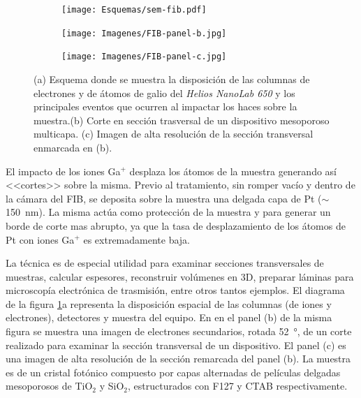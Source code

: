 		\begin{figure}[b!]
			  		  \begin{subfigure}[t]{\textwidth}
			  		  \centering\texttt{[image: Esquemas/sem-fib.pdf]}
			  		  \end{subfigure}
			  		  \begin{subfigure}[t]{0.498\textwidth}
			  		  \texttt{[image: Imagenes/FIB-panel-b.jpg]}
			  		  \end{subfigure}
			  		  \begin{subfigure}[t]{0.498\textwidth}
			  		  \texttt{[image: Imagenes/FIB-panel-c.jpg]}
			  		  \end{subfigure}
			  		  \caption[Esquema de las microscopias FIB/SEM]{(a) Esquema donde se muestra la disposición de las columnas de electrones y de átomos de galio del \textit{Helios NanoLab 650} y los principales eventos que ocurren al impactar los haces sobre la muestra.(b) Corte en sección trasversal de un dispositivo mesoporoso multicapa. (c) Imagen de alta resolución de la sección transversal enmarcada en (b).}
			  		  \label{esq:sem-fib}
			  		  \end{figure}

		El impacto de los iones Ga${^+}$ desplaza los átomos de la muestra generando así <<cortes>> sobre la misma. Previo al tratamiento, sin romper vacío y dentro de la cámara del FIB, se deposita sobre la muestra una delgada capa de Pt ($\sim$\SI{150}{\nm}). La misma actúa como protección de la muestra y para generar un borde de corte mas abrupto, ya que la tasa de desplazamiento de los átomos de Pt con iones Ga${^+}$ es extremadamente baja.\cite{Giannuzzi2005,Orloff1996} 

		\pagebreak La técnica es de especial utilidad para examinar secciones transversales de muestras, calcular espesores, reconstruir volúmenes en 3D, preparar láminas para microscopía electrónica de trasmisión, entre otros tantos ejemplos. El diagrama de la figura \ref{esq:sem-fib}a representa la disposición espacial de las columnas (de iones y electrones), detectores y muestra del equipo. En en el panel (b) de la misma figura se muestra una imagen de electrones secundarios, rotada \SI{52}{\degree}, de un corte realizado para examinar la sección transversal de un dispositivo. El panel (c) es una imagen de alta resolución de la sección remarcada del panel (b). La muestra es de un cristal fotónico compuesto por capas alternadas de películas delgadas mesoporosos de TiO$_2$ y SiO$_2$, estructurados con F127 y CTAB respectivamente.\cite{Gimenez2017}

